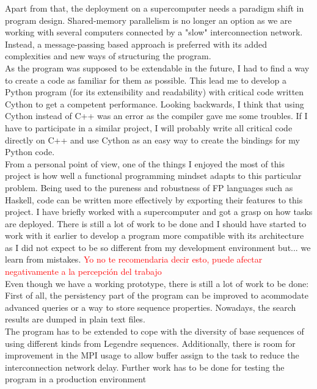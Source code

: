 \documentclass{tfg_domingo}
\newcommand{\domingo}[1]{\textcolor{red}{#1}}
\begin{document}
  Apart from that, the deployment on a
  supercomputer needs a paradigm shift in program design. Shared-memory
  parallelism is no longer an option as we are working with several computers
  connected by a "slow" interconnection network. Instead, a message-passing
  based approach is preferred with its added complexities and new ways of
  structuring the program.\\

  As the program was supposed to be extendable in the future, I had to
  find a way to create a code as familiar for them as possible. This lead me to
  develop a Python program (for its extensibility and readability) with
  critical code written Cython to get a competent performance. Looking
  backwards, I think that using Cython instead of C++ was an error as the
  compiler gave me some troubles. If I have to participate in a similar project,
  I will probably write all critical code directly on C++ and use Cython as
  an easy way to create the bindings for my Python code.\\

 From a personal point of view,  one of the things I enjoyed the most of this project is how well a
  functional programming mindset adapts to this particular problem. Being
  used to the pureness and robustness of FP languages such as Haskell,
  code can be written more effectively by exporting their features to this
  project.  I have briefly worked with a supercomputer and got a grasp
  on how tasks are deployed. There is still a lot of work to be done and I
  should have started to work with it earlier to develop a program more
  compatible with its architecture as I did not expect to be so different from
  my development environment but... we learn from mistakes. \domingo{Yo no te recomendaria decir esto, puede afectar negativamente a la percepción del trabajo}\\


 Even though we have a working prototype, there is still a lot of work to be done:\\

  First of all, the persistency part of the program can be improved to acommodate advanced queries or a way to store sequence properties.
  Nowadays, the search results are dumped in plain text files.\\

  The program has to be extended to cope with the diversity of base sequences of using different kinds from Legendre sequences. Additionally, there is room for improvement in the MPI usage to allow buffer assign to the task  to reduce the interconnection network delay.  Further work has to be done for testing the program in a production environment\\
\end{document}

